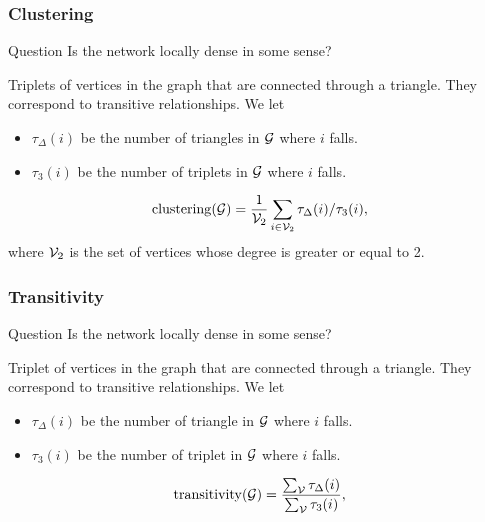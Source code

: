 \documentclass{beamer}\usepackage[]{graphicx}\usepackage[]{color}
\begin{document}
\begin{frame}
  \frametitle{Clustering}

  \begin{block}{Question}
    Is the network locally \alert{dense} in some sense?
  \end{block}

  \begin{definition}[Triangle]
    Triplets of vertices in the graph that are connected through a triangle. They correspond to transitive relationships. We let 
    \begin{itemize}
      \item $\tau_{\Delta}(i)$ be the number of triangles in $\mathcal{G}$ where $i$ falls.
      \item $\tau_{3}(i)$ be the number of triplets in $\mathcal{G}$ where $i$ falls.
    \end{itemize}    
  \end{definition}


  \begin{definition}
    \[
      \mathrm{clustering}(\mathcal{G}) = \frac{1}{\mathcal{V}_2} \sum_{i\in\mathcal{V}_2} \tau_{\Delta}(i) / \tau_3(i),
    \]
    where $\mathcal{V}_2$ is the set of vertices whose degree is greater or equal to 2.
  \end{definition}

\end{frame}

\begin{frame}
  \frametitle{Transitivity}

  \begin{block}{Question}
    Is the network locally \alert{dense} in some sense?
  \end{block}

  \begin{definition}[Triangle]
    Triplet of vertices in the graph that are connected through a triangle. They correspond to transitive relationships. We let 
    \begin{itemize}
      \item $\tau_{\Delta}(i)$ be the number of triangle in $\mathcal{G}$ where $i$ falls.
      \item $\tau_{3}(i)$ be the number of triplet in $\mathcal{G}$ where $i$ falls.
    \end{itemize}    
  \end{definition}

  \begin{definition}[Transitivity]
    
    \[
      \mathrm{transitivity}(\mathcal{G}) = \frac{\sum_{\mathcal{V}}\tau_{\Delta}(i)}{\sum_{\mathcal{V}}\tau_3(i)},
    \]
  \end{definition}

\end{frame}
\end{document}
